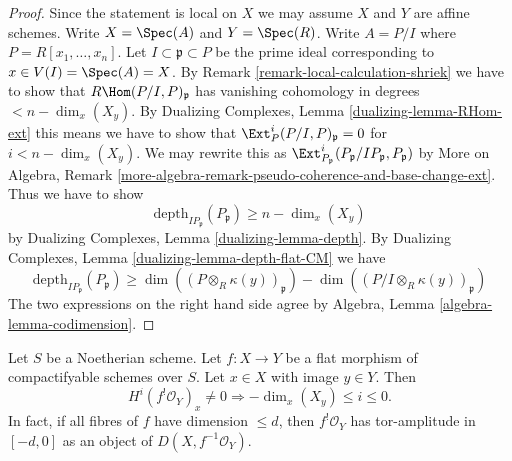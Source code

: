 \begin{proof}
Since the statement is local on $X$ we may assume $X$
and $Y$ are affine schemes. Write
$X = \Spec(A)$ and $Y = \Spec(R)$.
Write $A = P/I$ where $P = R[x_1, \ldots, x_n]$.
Let $I \subset \mathfrak p \subset P$ be the prime ideal
corresponding to $x \in V(I) = \Spec(A) = X$.
By Remark \ref{remark-local-calculation-shriek}
we have to show that $R\Hom(P/I, P)_\mathfrak p$
has vanishing cohomology in degrees $< n - \dim_x(X_y)$.
By Dualizing Complexes, Lemma \ref{dualizing-lemma-RHom-ext}
this means we have to
show that $\Ext_P^i(P/I, P)_\mathfrak p = 0$
for $i < n - \dim_x(X_y)$. We may rewrite this as
$\Ext_{P_\mathfrak p}^i(P_\mathfrak p/IP_\mathfrak p, P_\mathfrak p)$
by More on Algebra, Remark
\ref{more-algebra-remark-pseudo-coherence-and-base-change-ext}.
Thus we have to show
$$
\text{depth}_{IP_\mathfrak p}(P_\mathfrak p) \geq n - \dim_x(X_y)
$$
by Dualizing Complexes, Lemma \ref{dualizing-lemma-depth}. By
Dualizing Complexes, Lemma \ref{dualizing-lemma-depth-flat-CM}
we have
$$
\text{depth}_{IP_\mathfrak p}(P_\mathfrak p) \geq
\dim((P \otimes_R \kappa(y))_\mathfrak p) -
\dim((P/I \otimes_R \kappa(y))_\mathfrak p)
$$
The two expressions on the right hand side agree by
Algebra, Lemma \ref{algebra-lemma-codimension}.
\end{proof}

\begin{lemma}
\label{lemma-flat-shriek}
Let $S$ be a Noetherian scheme. Let $f : X \to Y$ be a flat morphism of
compactifyable schemes over $S$. Let $x \in X$ with image $y \in Y$.
Then
$$
H^i(f^!\mathcal{O}_Y)_x \not = 0
\Rightarrow - \dim_x(X_y) \leq i \leq 0.
$$
In fact, if all fibres of $f$ have dimension $\leq d$, then
$f^!\mathcal{O}_Y$ has tor-amplitude in $[-d, 0]$ as an object
of $D(X, f^{-1}\mathcal{O}_Y)$.
\end{lemma}

